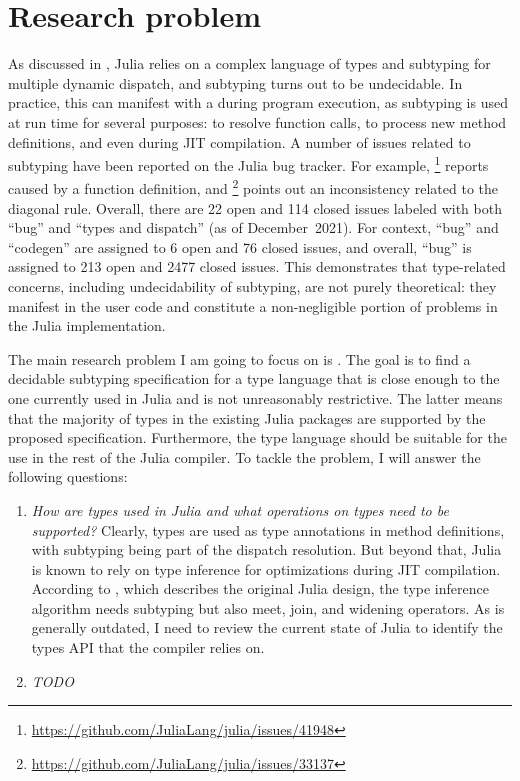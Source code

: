 \chapter{Research problem}

As discussed in , Julia relies on a complex language of types
and subtyping for multiple dynamic dispatch, and subtyping turns out to be
undecidable. In practice, this can manifest with a 
during program execution, as subtyping is used at run time for several purposes:
to resolve function calls, to process new method definitions, and even during
JIT compilation. A number of issues related to subtyping have been reported
on the Julia bug tracker. For example,
\href{https://github.com/JuliaLang/julia/issues/41948}{}\footnote{
    \url{https://github.com/JuliaLang/julia/issues/41948}
} reports  caused by a function definition,
and
\href{https://github.com/JuliaLang/julia/issues/33137}{}\footnote{
    \url{https://github.com/JuliaLang/julia/issues/33137}
} points out an inconsistency related to the diagonal rule.
Overall, there are 22 open and 114 closed issues labeled with both ``bug''
and ``types and dispatch'' (as of December~2021). For context, ``bug'' and
``codegen'' are assigned to 6 open and 76 closed issues, and overall, ``bug''
is assigned to 213 open and 2477 closed issues.
This demonstrates that type-related concerns, including undecidability of
subtyping, are not purely theoretical: they manifest in the user code and
constitute a non-negligible portion of problems in the Julia implementation.

The main research problem I am going to focus on is
.
The goal is to find a decidable subtyping specification for a type language
that is close enough to the one currently used in Julia
and is not unreasonably restrictive.
The latter means that the majority of types in the existing Julia packages
are supported by the proposed specification.
Furthermore, the type language should be suitable for the use in the rest of
the Julia compiler.
To tackle the problem, I will answer the following questions:
\begin{enumerate}
    \item \emph{How are types used in Julia and what operations on types
      need to be supported?}
      Clearly, types are used as type annotations in method definitions, with
      subtyping being part of the dispatch resolution.
      But beyond that, Julia is known to rely on type inference for optimizations
      during JIT compilation. According to \citet{TODO}, which describes the
      original Julia design, the type inference algorithm needs subtyping
      but also meet, join, and widening operators.
      As \cite{TODO} is generally outdated, I need to review the current state
      of Julia to identify the types API that the compiler relies on.
    \item \emph{TODO}
\end{enumerate}
